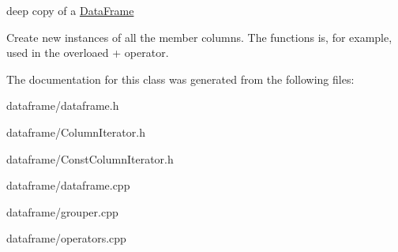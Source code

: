 deep copy of a \hyperlink{classDataFrame}{Data\+Frame} 

Create new instances of all the member columns. The functions is, for example, used in the overloaed + operator. 

The documentation for this class was generated from the following files\+:\begin{DoxyCompactItemize}
\item 
dataframe/dataframe.\+h\item 
dataframe/Column\+Iterator.\+h\item 
dataframe/Const\+Column\+Iterator.\+h\item 
dataframe/dataframe.\+cpp\item 
dataframe/grouper.\+cpp\item 
dataframe/operators.\+cpp\end{DoxyCompactItemize}
